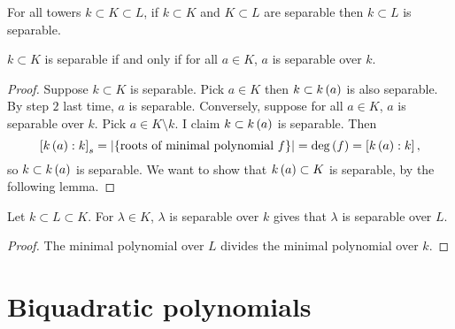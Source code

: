 
\begin{corollary}
For all towers $ k \subset K \subset L $, if $ k \subset K $ and $ K \subset L $ are separable then $ k \subset L $ is separable.
\end{corollary}

\begin{corollary}
$ k \subset K $ is separable if and only if for all $ a \in K $, $ a $ is separable over $ k $.
\end{corollary}

\begin{proof}
Suppose $ k \subset K $ is separable. Pick $ a \in K $ then $ k \subset k\left( a \right) $ is also separable. By step $ 2 $ last time, $ a $ is separable. Conversely, suppose for all $ a \in K $, $ a $ is separable over $ k $. Pick $ a \in K \setminus k $. I claim $ k \subset k\left( a \right) $ is separable. Then
$$ \left[ k\left( a \right) : k \right]_s = \left\lvert \left\{ \text{roots of minimal polynomial} \ f \right\} \right\rvert = \deg\left( f \right) = \left[ k\left( a \right) : k \right], $$
so $ k \subset k\left( a \right) $ is separable. We want to show that $ k\left( a \right) \subset K $ is separable, by the following lemma.
\end{proof}

\begin{lemma}
Let $ k \subset L \subset K $. For $ \lambda \in K $, $ \lambda $ is separable over $ k $ gives that $ \lambda $ is separable over $ L $.
\end{lemma}

\begin{proof}
The minimal polynomial over $ L $ divides the minimal polynomial over $ k $.
\end{proof}

\pagebreak

\section{Biquadratic polynomials}

